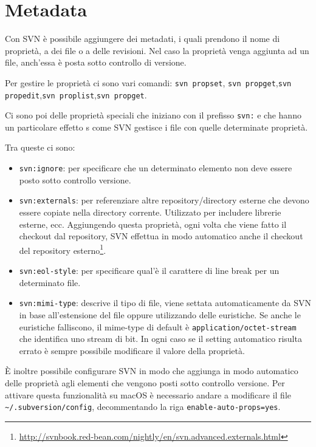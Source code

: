 \section{Metadata}

Con SVN è possibile aggiungere dei metadati, i quali prendono il nome di proprietà, a dei file o a delle revisioni. Nel caso la proprietà venga aggiunta ad un file, anch'essa è posta sotto controllo di versione.

Per gestire le proprietà ci sono vari comandi: \texttt{svn propset}, \texttt{svn propget},\texttt{svn propedit},\texttt{svn proplist},\texttt{svn propget}.

Ci sono poi delle proprietà speciali che iniziano con il prefisso \texttt{svn:} e che hanno un particolare effetto s come SVN gestisce i file con quelle determinate proprietà.

Tra queste ci sono:

\begin{itemize}
	\item \texttt{svn:ignore}: per specificare che un determinato elemento non deve essere posto sotto controllo versione.
	\item \texttt{svn:externals}: per referenziare altre repository/directory esterne che devono essere copiate nella directory corrente. Utilizzato per includere librerie esterne, ecc.
	Aggiungendo questa proprietà, ogni volta che viene fatto il checkout dal repository, SVN effettua in modo automatico anche il checkout del repository esterno\footnote{\url{http://svnbook.red-bean.com/nightly/en/svn.advanced.externals.html}}.
	\item \texttt{svn:eol-style}: per specificare qual'è il carattere di line break per un determinato file.
	\item \texttt{svn:mimi-type}: descrive il tipo di file, viene settata automaticamente da SVN in base all'estensione del file oppure utilizzando delle euristiche. Se anche le euristiche falliscono, il mime-type di default è \texttt{application/octet-stream} che identifica uno stream di bit. In ogni caso se il setting automatico risulta errato è sempre possibile modificare il valore della proprietà.

\end{itemize}

\`E inoltre possibile configurare SVN in modo che aggiunga in modo automatico delle proprietà agli elementi che vengono posti sotto controllo versione. Per attivare questa funzionalità su macOS è necessario andare a modificare il file \texttt{\textasciitilde/.subversion/config}, decommentando la riga \texttt{enable-auto-props=yes}.

